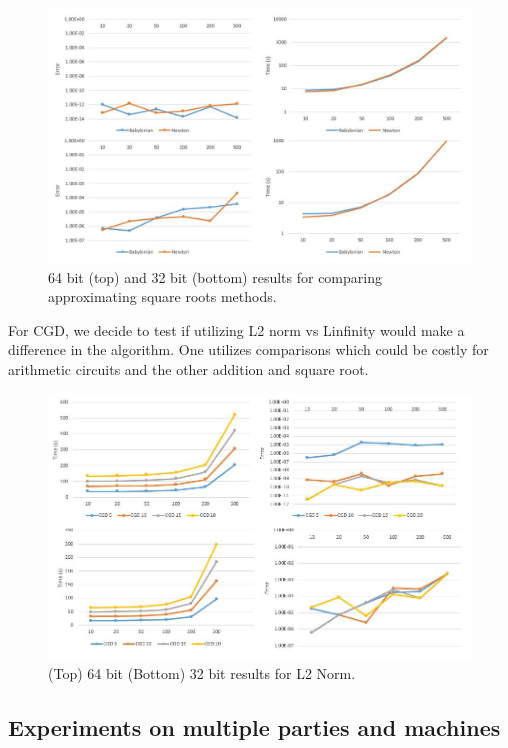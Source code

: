 \documentclass{article}
\theoremstyle{plain}
\theoremstyle{definition}
\theoremstyle{remark}
\begin{document}
\begin{figure}[h]
     \centering
  \includegraphics[scale=0.45]{sqrt.jpg}
  \caption{ 64 bit (top) and 32 bit (bottom) results for comparing approximating square roots methods.}
  \label{fig:result1}
\end{figure}

\noindent
For CGD, we decide to test if utilizing L2 norm vs Linfinity would make a difference in the algorithm. One utilizes comparisons which could be costly for arithmetic circuits and the other addition and square root. 

\begin{figure}[H]
\centering
  \includegraphics[scale=0.45]{l2.jpg}
  \caption{ (Top) 64 bit (Bottom) 32 bit results for L2 Norm. }
  \label{fig:result1}
\end{figure}

\subsection{Experiments on multiple parties and machines}
\end{document}
